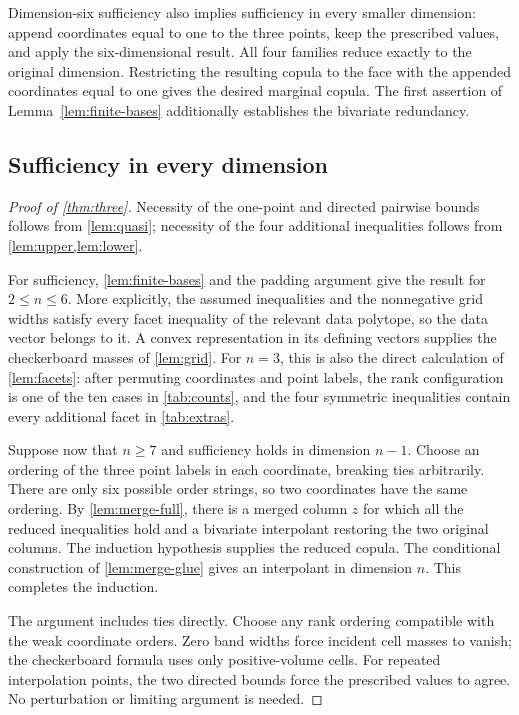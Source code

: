 \documentclass[a4paper,11pt]{amsart}
\numberwithin{equation}{section}
\theoremstyle{definition}
\theoremstyle{remark}
\begin{document}
Dimension-six sufficiency also implies sufficiency in every smaller
dimension: append coordinates equal to one to the three points, keep
the prescribed values, and apply the six-dimensional result. All four
families reduce exactly to the original dimension. Restricting the
resulting copula to the face with the appended coordinates equal to
one gives the desired marginal copula. The first assertion of
Lemma~\ref{lem:finite-bases} additionally establishes the bivariate redundancy.


\subsection{Sufficiency in every dimension}
\begin{proof}[Proof of \cref{thm:three}]
Necessity of the one-point and directed pairwise bounds follows from
\cref{lem:quasi}; necessity of the four additional inequalities follows
from \cref{lem:upper,lem:lower}.

For sufficiency, \cref{lem:finite-bases} and the padding argument give the
result for $2\leq n\leq6$. More explicitly, the assumed inequalities and
the nonnegative grid widths satisfy every facet inequality of the relevant
data polytope, so the data vector belongs to it. A convex representation
in its defining vectors supplies the checkerboard masses of \cref{lem:grid}.
For $n=3$, this is also the direct calculation of \cref{lem:facets}:
after permuting coordinates and point labels, the rank configuration is
one of the ten cases in \cref{tab:counts}, and the four symmetric
inequalities contain every additional facet in \cref{tab:extras}.

Suppose now that $n\geq7$ and sufficiency holds in dimension $n-1$.
Choose an ordering of the three point labels in each coordinate,
breaking ties arbitrarily. There are only six possible order strings,
so two coordinates have the same ordering. By \cref{lem:merge-full},
there is a merged column $z$ for which all the reduced inequalities hold
and a bivariate interpolant restoring the two original columns.
The induction hypothesis supplies the reduced copula. The conditional
construction of \cref{lem:merge-glue} gives an interpolant in dimension $n$.
This completes the induction.

The argument includes ties directly. Choose any rank ordering compatible
with the weak coordinate orders. Zero band widths force incident cell
masses to vanish; the checkerboard formula uses only positive-volume cells.
For repeated interpolation points, the two directed bounds force the
prescribed values to agree. No perturbation or limiting argument is needed.


\end{proof}
\end{document}
